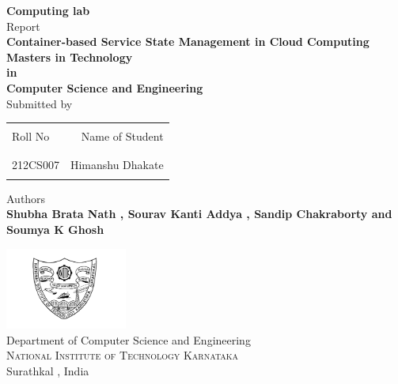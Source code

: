 \begin{titlepage}

\begin{center}

\textup{\small {\bf Computing lab} \\ Report}\\[0.2in]

\Large \textbf {Container-based Service State Management in
Cloud Computing}\\[0.5in]

       

       {\bf Masters in Technology \\in\\ Computer Science and Engineering}\\[0.5in]

\normalsize Submitted by \\
\begin{table}[h]
\centering
\begin{tabular}{lr}\hline \\
Roll No & Name of Student \\ \\ \hline
\\
212CS007 & Himanshu Dhakate \\
 \\ \hline 
\end{tabular}
\end{table}

\vspace{.1in}
Authors\\
{\textbf{Shubha Brata Nath , Sourav Kanti Addya , Sandip Chakraborty and Soumya K Ghosh}}\\[0.2in]

\vfill

\includegraphics[width=0.3\textwidth]{nitk}\\[0.5in]
\Large{Department of Computer Science and Engineering}\\
\normalsize
\textsc{National Institute of Technology Karnataka}\\
Surathkal , India  \\
\vspace{0.2cm}
\vspace{0.2cm}


\end{center}

\end{titlepage}
